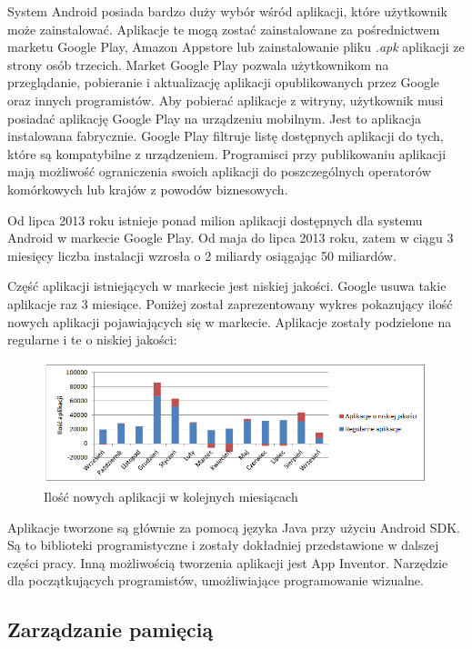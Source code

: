 System Android posiada bardzo duży wybór wśród aplikacji, które użytkownik może zainstalować. Aplikacje te mogą zostać zainstalowane za pośrednictwem marketu Google Play, Amazon Appstore lub zainstalowanie pliku \emph{.apk} aplikacji ze strony osób trzecich.\cite{android:32} Market Google Play pozwala użytkownikom na przeglądanie, pobieranie i aktualizację aplikacji opublikowanych przez Google oraz innych programistów. Aby pobierać aplikacje z witryny, użytkownik musi posiadać aplikację Google Play na urządzeniu mobilnym. Jest to aplikacja instalowana fabrycznie. Google Play filtruje listę dostępnych aplikacji do tych, które są kompatybilne z urządzeniem. Programisci przy publikowaniu aplikacji mają możliwość ograniczenia swoich aplikacji do poszczególnych operatorów komórkowych lub krajów z powodów biznesowych.\cite{android:33}

Od lipca 2013 roku istnieje ponad milion aplikacji dostępnych dla systemu Android w markecie Google Play.\cite{android:34} Od maja do lipca 2013 roku, zatem w ciągu 3 miesięcy liczba instalacji wzrosła o 2 miliardy osiągając 50 miliardów.\cite{android:34}\cite{android:35}

Część aplikacji istniejących w markecie jest niskiej jakości. Google usuwa takie aplikacje raz 3 miesiące.\cite{android:49} Poniżej został zaprezentowany wykres pokazujący ilość nowych aplikacji pojawiających się w markecie. Aplikacje zostały podzielone na regularne i te o niskiej jakości:

\begin{figure}[H] 
\centering\includegraphics[width=12cm]{figures/android/numerOfApps}
\caption{Ilość nowych aplikacji w kolejnych miesiącach}
\end{figure}


Aplikacje tworzone są głównie za pomocą języka Java przy użyciu Android SDK. Są to biblioteki programistyczne i zostały dokładniej przedstawione w dalszej części pracy. Inną możliwością tworzenia aplikacji jest App Inventor. Narzędzie dla początkujących programistów, umożliwiające programowanie wizualne.

\subsection{Zarządzanie pamięcią}

